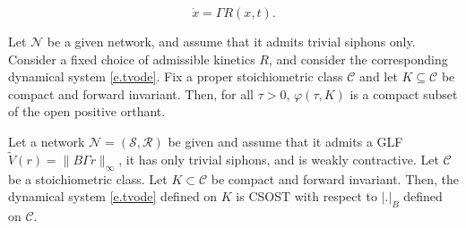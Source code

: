 \documentclass[10pt,a4paper]{amsart}
\newcommand{\Cs}{\mathscr C}
\newcommand{\Ns}{{\mathscr N}}
\newcommand{\Rs}{{\mathscr R}}
\newcommand{\Ss}{{\mathscr S}}
\newcommand{\tV}{{\widetilde{V}}}
\begin{document}
\begin{equation}\label{e.tvode}
	\dot x= \Gamma R(x,t).
\end{equation}

\begin{lemma}\label{lem.sep}
	Let $\Ns$ be a given network, and assume that it admits trivial siphons only. Consider a fixed choice of admissible kinetics $R$, and consider the corresponding dynamical system \eqref{e.tvode}.   Fix a proper stoichiometric class $\Cs$ and let $K \subseteq \Cs$ be compact and forward invariant.  Then, for all $\tau>0$, $\varphi(\tau,K)$ is a compact subset of the open positive orthant. %
\end{lemma}

\begin{theorem}\label{th.glf_sost}
	Let a network $\Ns=(\Ss,\Rs)$ be given and assume that it admits a GLF $\tV(r)=\|B\Gamma r\|_\infty$, it has only trivial siphons, and is weakly contractive.  Let $\Cs$ be a stoichiometric class. Let $K\subset \Cs$ be compact and forward invariant. Then, the dynamical system \eqref{e.tvode} defined on $K$ is CSOST with respect to $|.|_B$ defined on $\Cs$.
\end{theorem}
\end{document}
